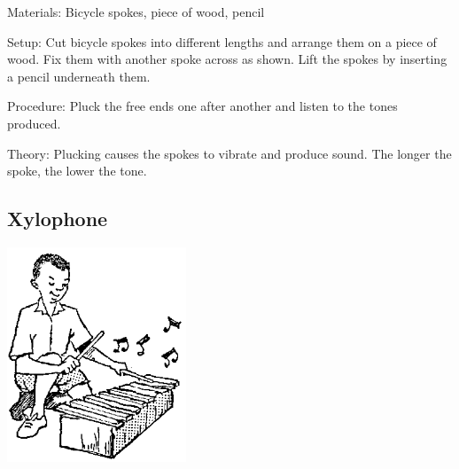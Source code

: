 \begin{multicols}{2}
\begin{description*}
\item[Materials:]{Bicycle spokes, piece of wood, pencil}
\item[Setup:]{Cut bicycle spokes into different lengths and arrange them on a piece of wood. Fix them with another spoke across as shown. Lift the spokes by inserting a pencil underneath them.}
\item[Procedure:]{Pluck the free ends one after another and listen to the tones produced.}
\item[Theory:]{Plucking causes the spokes to vibrate and produce sound. The longer the spoke, the lower the tone.}
\end{description*}

\subsection{Xylophone}

\begin{center}
\includegraphics[width=0.4\textwidth]{./img/source/xylophone.png}
\end{center}


\end{multicols}
